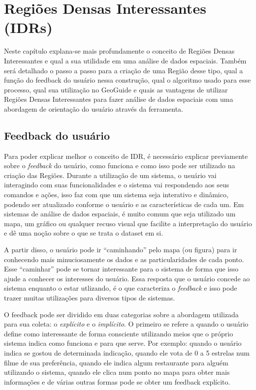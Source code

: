 \chapter{Regiões Densas Interessantes (IDRs)}
\label{chap:idrs}

Neste capítulo explana-se mais profundamente o conceito de Regiões Densas Interessantes e qual a sua utilidade em uma análise de dados espaciais. Também será detalhado o passo a passo para a criação de uma Região desse tipo, qual a função do feedback do usuário nessa construção, qual o algoritmo usado para esse processo, qual sua utilização no GeoGuide e quais as vantagens de utilizar Regiões Densas Interessantes para fazer análise de dados espaciais com uma abordagem de orientação do usuário através da ferramenta.

\section{Feedback do usuário}

Para poder explicar melhor o conceito de IDR, é necessário explicar previamente sobre o \textit{feedback} do usuário, como funciona e como isso pode ser utilizado na criação das Regiões. Durante a utilização de um sistema, o usuário vai interagindo com suas funcionalidades e o sistema vai respondendo aos seus comandos e ações, isso faz com que um sistema seja interativo e dinâmico, podendo ser atualizado conforme o usuário e as características de cada um. Em sistemas de análise de dados espaciais, é muito comum que seja utilizado um mapa, um gráfico ou qualquer recuso visual que facilite a interpretação do usuário e dê uma noção sobre o que se trata o dataset em si.

A partir disso, o usuário pode ir ``caminhando'' pelo mapa (ou figura) para ir conhecendo mais minuciosamente os dados e as particularidades de cada ponto. Esse ``caminhar'' pode se tornar interessante para o sistema de forma que isso ajude a conhecer os interesses do usuário. Essa resposta que o usuário concede ao sistema enquanto o estar utlizando, é o que caracteriza o \textit{feedback} e isso pode trazer muitas utilizações para diversos tipos de sistemas.

O feedback pode ser dividido em duas categorias sobre a abordagem utilizada para sua coleta: o \textit{explícito} e o \textit{implícito}. O primeiro se refere a quando o usuário define como interessante de forma consciente utilizando meios que o próprio sistema indica como funciona e para que serve. Por exemplo: quando o usuário indica se gostou de determinada indicação, quando ele vota de 0 a 5 estrelas num filme de sua preferência, quando ele indica algum restaurante para alguém utilizando o sistema, quando ele clica num ponto no mapa para obter mais informações e de várias outras formas pode se obter um feedback explícito.

